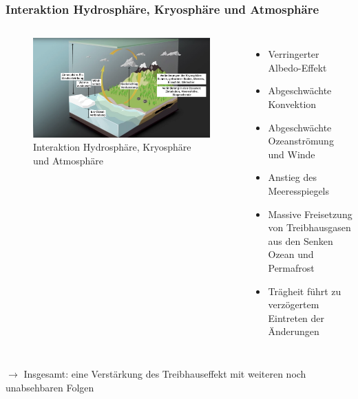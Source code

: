 \begin{frame}
	\frametitle{Interaktion Hydrosphäre, Kryosphäre und Atmosphäre}
	\begin{columns}
		\begin{figure}
			\centering
			\includegraphics[width=\linewidth]{bilder/WMO_Cycles_factors_waterAndIce.png}
			\caption{Interaktion Hydrosphäre, Kryosphäre und Atmosphäre}
		\end{figure}
		\begin{itemize}
			\item Verringerter Albedo-Effekt
			\item Abgeschwächte Konvektion
			\item Abgeschwächte Ozeanströmung und Winde
			\item Anstieg des Meeresspiegels
			\item Massive Freisetzung von Treibhausgasen aus den Senken Ozean und Permafrost
			\item Trägheit führt zu verzögertem Eintreten der Änderungen
		\end{itemize}
	\end{columns}
	\begin{block}{}
			$\rightarrow$ Insgesamt: eine Verstärkung des Treibhauseffekt mit weiteren noch unabsehbaren Folgen
	\end{block}

\end{frame}
